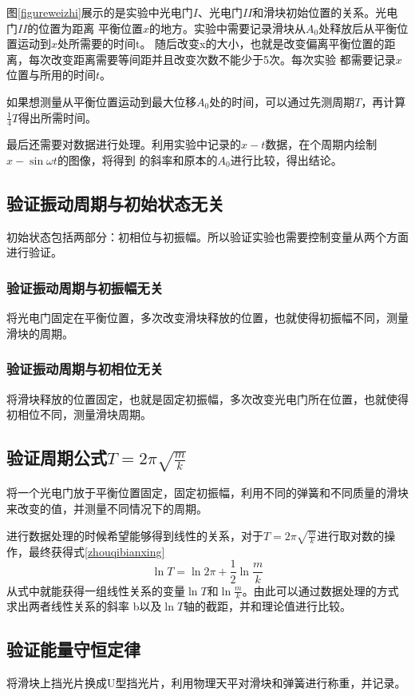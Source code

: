 \documentclass{ctexart}
\begin{document}
  图\ref{figureweizhi}展示的是实验中光电门$I$、光电门$II$和滑块初始位置的关系。光电门$II$的位置为距离
  平衡位置$x$的地方。实验中需要记录滑块从$A_{0}$处释放后从平衡位置运动到$x$处所需要的时间t。
  随后改变x的大小，也就是改变偏离平衡位置的距离，每次改变距离需要等间距并且改变次数不能少于5次。每次实验
  都需要记录$x$位置与所用的时间$t$。

  如果想测量从平衡位置运动到最大位移$A_{0}$处的时间，可以通过先测周期$T$，再计算$\frac{1}{4}T$得出所需时间。
  
  最后还需要对数据进行处理。利用实验中记录的$x-t$数据，在个周期内绘制$x-\sin{\omega t}$的图像，将得到
  的斜率和原本的$A_{0}$进行比较，得出结论。

  \subsection{验证振动周期与初始状态无关}
  初始状态包括两部分：初相位与初振幅。所以验证实验也需要控制变量从两个方面进行验证。
    \subsubsection{验证振动周期与初振幅无关}
    将光电门固定在平衡位置，多次改变滑块释放的位置，也就使得初振幅不同，测量滑块的周期。
    \subsubsection{验证振动周期与初相位无关}
    将滑块释放的位置固定，也就是固定初振幅，多次改变光电门所在位置，也就使得初相位不同，测量滑块周期。

  \subsection{验证周期公式$T=2\pi \sqrt{\frac{m}{k}}$}
  将一个光电门放于平衡位置固定，固定初振幅，利用不同的弹簧和不同质量的滑块来改变的值，并测量不同情况下的周期。

  进行数据处理的时候希望能够得到线性的关系，对于$T=2\pi \sqrt{\frac{m}{k}}$进行取对数的操作，最终获得式\ref{zhouqibianxing}
  \begin{equation}\label{zhouqibianxing}
    \ln T = \ln 2\pi +\frac{1}{2} \ln \frac{m}{k}
  \end{equation}
  从式中就能获得一组线性关系的变量$\ln T \mbox{和} \ln \frac{m}{k}$。由此可以通过数据处理的方式求出两者线性关系的斜率
  b以及$\ln T$轴的截距，并和理论值进行比较。

  \subsection{验证能量守恒定律}
  将滑块上挡光片换成U型挡光片，利用物理天平对滑块和弹簧进行称重，并记录。
\end{document}

